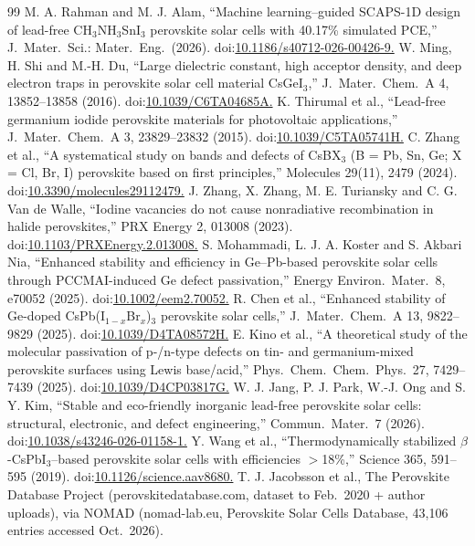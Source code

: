 \documentclass[review]{elsarticle}
\begin{document}
\begin{thebibliography}{99}
 M. A. Rahman and M. J. Alam, ``Machine learning--guided SCAPS-1D design of lead-free CH$_{3}$NH$_{3}$SnI$_{3}$ perovskite solar cells with 40.17\% simulated PCE,'' J.\ Mater.\ Sci.: Mater.\ Eng.\ (2026). doi:\url{10.1186/s40712-026-00426-9.}
 W. Ming, H. Shi and M.-H. Du, ``Large dielectric constant, high acceptor density, and deep electron traps in perovskite solar cell material CsGeI$_{3}$,'' J.\ Mater.\ Chem.\ A 4, 13852--13858 (2016). doi:\url{10.1039/C6TA04685A.}
 K. Thirumal et al., ``Lead-free germanium iodide perovskite materials for photovoltaic applications,'' J.\ Mater.\ Chem.\ A 3, 23829--23832 (2015). doi:\url{10.1039/C5TA05741H.}
 C. Zhang et al., ``A systematical study on bands and defects of CsBX$_{3}$ (B = Pb, Sn, Ge; X = Cl, Br, I) perovskite based on first principles,'' Molecules 29(11), 2479 (2024). doi:\url{10.3390/molecules29112479.}
 J. Zhang, X. Zhang, M. E. Turiansky and C. G. Van de Walle, ``Iodine vacancies do not cause nonradiative recombination in halide perovskites,'' PRX Energy 2, 013008 (2023). doi:\url{10.1103/PRXEnergy.2.013008.}
 S. Mohammadi, L. J. A. Koster and S. Akbari Nia, ``Enhanced stability and efficiency in Ge--Pb-based perovskite solar cells through PCCMAI-induced Ge defect passivation,'' Energy Environ.\ Mater.\ 8, e70052 (2025). doi:\url{10.1002/eem2.70052.}
 R. Chen et al., ``Enhanced stability of Ge-doped CsPb(I$_{1-x}$Br$_{x}$)$_{3}$ perovskite solar cells,'' J.\ Mater.\ Chem.\ A 13, 9822--9829 (2025). doi:\url{10.1039/D4TA08572H.}
 E. Kino et al., ``A theoretical study of the molecular passivation of p-/n-type defects on tin- and germanium-mixed perovskite surfaces using Lewis base/acid,'' Phys.\ Chem.\ Chem.\ Phys.\ 27, 7429--7439 (2025). doi:\url{10.1039/D4CP03817G.}
 W. J. Jang, P. J. Park, W.-J. Ong and S. Y. Kim, ``Stable and eco-friendly inorganic lead-free perovskite solar cells: structural, electronic, and defect engineering,'' Commun.\ Mater.\ 7 (2026). doi:\url{10.1038/s43246-026-01158-1.}
 Y. Wang et al., ``Thermodynamically stabilized $\beta$-CsPbI$_{3}$--based perovskite solar cells with efficiencies $>$18\%,'' Science 365, 591--595 (2019). doi:\url{10.1126/science.aav8680.}
 T. J. Jacobsson et al., The Perovskite Database Project (perovskitedatabase.com, dataset to Feb.\ 2020 + author uploads), via NOMAD (nomad-lab.eu, Perovskite Solar Cells Database, 43,106 entries accessed Oct.\ 2026).
\end{thebibliography}
\end{document}

